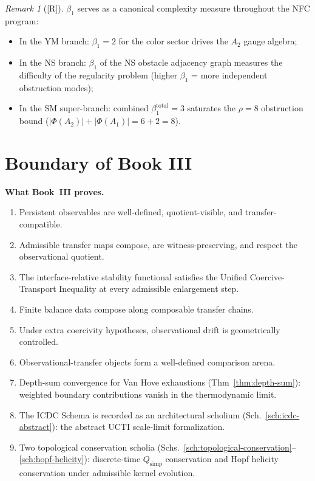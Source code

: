 \documentclass[12pt,oneside]{amsbook}
\theoremstyle{plain}
\theoremstyle{definition}
\theoremstyle{remark}
\newtheorem{remark}[theorem]{Remark}
\newcommand{\status}[1]{\textup{[#1]}}
\begin{document}
\begin{remark}[\status{R}]
$\beta_1$ serves as a canonical complexity measure throughout the
NFC program:
\begin{itemize}
  \item In the YM branch: $\beta_1 = 2$ for the color sector
    drives the $A_2$ gauge algebra;
  \item In the NS branch: $\beta_1$ of the NS obstacle adjacency
    graph measures the difficulty of the regularity problem
    (higher $\beta_1$ = more independent obstruction modes);
  \item In the SM super-branch: combined $\beta_1^{\mathrm{total}}
    = 3$ saturates the $\rho = 8$ obstruction bound
    ($|\Phi(A_2)| + |\Phi(A_1)| = 6 + 2 = 8$).
\end{itemize}
\end{remark}

\section{Boundary of Book III}

\textbf{What Book~III proves.}
\begin{enumerate}
  \item Persistent observables are well-defined, quotient-visible,
        and transfer-compatible.
  \item Admissible transfer maps compose, are witness-preserving,
        and respect the observational quotient.
  \item The interface-relative stability functional satisfies the
        Unified Coercive-Transport Inequality at every admissible
        enlargement step.
  \item Finite balance data compose along composable transfer
        chains.
  \item Under extra coercivity hypotheses, observational drift is
        geometrically controlled.
  \item Observational-transfer objects form a well-defined
        comparison arena.
  \item Depth-sum convergence for Van Hove exhaustions
        (Thm~\ref{thm:depth-sum}): weighted boundary contributions
        vanish in the thermodynamic limit.
  \item The ICDC Schema is recorded as an architectural scholium
        (Sch.~\ref{sch:icdc-abstract}): the abstract UCTI
        scale-limit formalization.
  \item Two topological conservation scholia
        (Schs.~\ref{sch:topological-conservation}--\ref{sch:hopf-helicity}):
        discrete-time $Q_{\mathrm{simp}}$ conservation and Hopf
        helicity conservation under admissible kernel evolution.
\end{enumerate}
\end{document}
